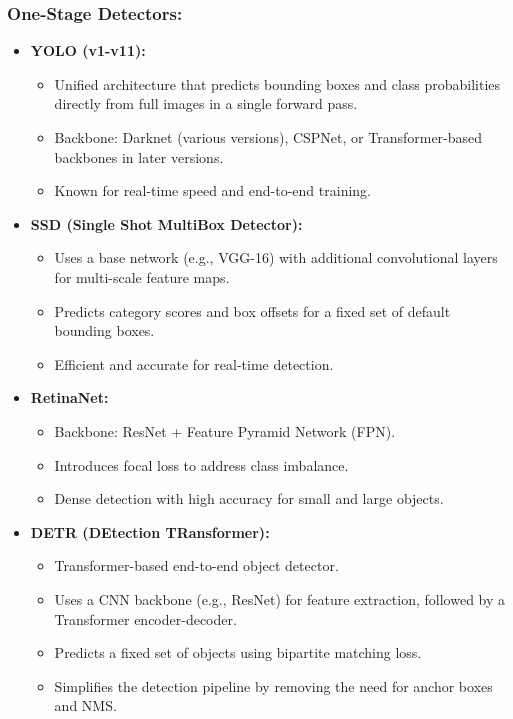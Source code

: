 \documentclass{article}
\begin{document}
\subsubsection{One-Stage Detectors:}
\begin{itemize}[leftmargin=1.5em]
    \item \textbf{YOLO (v1-v11):} 
        \begin{itemize}
            \item Unified architecture that predicts bounding boxes and class probabilities directly from full images in a single forward pass.
            \item Backbone: Darknet (various versions), CSPNet, or Transformer-based backbones in later versions.
            \item Known for real-time speed and end-to-end training.
        \end{itemize}
    \item \textbf{SSD (Single Shot MultiBox Detector):}
        \begin{itemize}
            \item Uses a base network (e.g., VGG-16) with additional convolutional layers for multi-scale feature maps.
            \item Predicts category scores and box offsets for a fixed set of default bounding boxes.
            \item Efficient and accurate for real-time detection.
        \end{itemize}
    \item \textbf{RetinaNet:}
        \begin{itemize}
            \item Backbone: ResNet + Feature Pyramid Network (FPN).
            \item Introduces focal loss to address class imbalance.
            \item Dense detection with high accuracy for small and large objects.
        \end{itemize}
    \item \textbf{DETR (DEtection TRansformer):}
        \begin{itemize}
            \item Transformer-based end-to-end object detector.
            \item Uses a CNN backbone (e.g., ResNet) for feature extraction, followed by a Transformer encoder-decoder.
            \item Predicts a fixed set of objects using bipartite matching loss.
            \item Simplifies the detection pipeline by removing the need for anchor boxes and NMS.
        \end{itemize}
\end{itemize}
\end{document}
